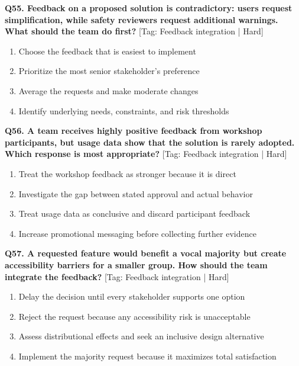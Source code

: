 \noindent\textbf{Q55. Feedback on a proposed solution is contradictory: users request simplification, while safety reviewers request additional warnings. What should the team do first?} \hfill [Tag: Feedback integration | Hard]
\begin{enumerate}[label=(\alph*),topsep=2pt,itemsep=1pt,partopsep=0pt,parsep=0pt]
    \item {Choose the feedback that is easiest to implement}
    \item {Prioritize the most senior stakeholder's preference}
    \item {Average the requests and make moderate changes}
    \item {Identify underlying needs, constraints, and risk thresholds}
\end{enumerate}
\vspace{2mm}

\noindent\textbf{Q56. A team receives highly positive feedback from workshop participants, but usage data show that the solution is rarely adopted. Which response is most appropriate?} \hfill [Tag: Feedback integration | Hard]
\begin{enumerate}[label=(\alph*),topsep=2pt,itemsep=1pt,partopsep=0pt,parsep=0pt]
    \item {Treat the workshop feedback as stronger because it is direct}
    \item {Investigate the gap between stated approval and actual behavior}
    \item {Treat usage data as conclusive and discard participant feedback}
    \item {Increase promotional messaging before collecting further evidence}
\end{enumerate}
\vspace{2mm}

\noindent\textbf{Q57. A requested feature would benefit a vocal majority but create accessibility barriers for a smaller group. How should the team integrate the feedback?} \hfill [Tag: Feedback integration | Hard]
\begin{enumerate}[label=(\alph*),topsep=2pt,itemsep=1pt,partopsep=0pt,parsep=0pt]
    \item {Delay the decision until every stakeholder supports one option}
    \item {Reject the request because any accessibility risk is unacceptable}
    \item {Assess distributional effects and seek an inclusive design alternative}
    \item {Implement the majority request because it maximizes total satisfaction}
\end{enumerate}
\vspace{2mm}

